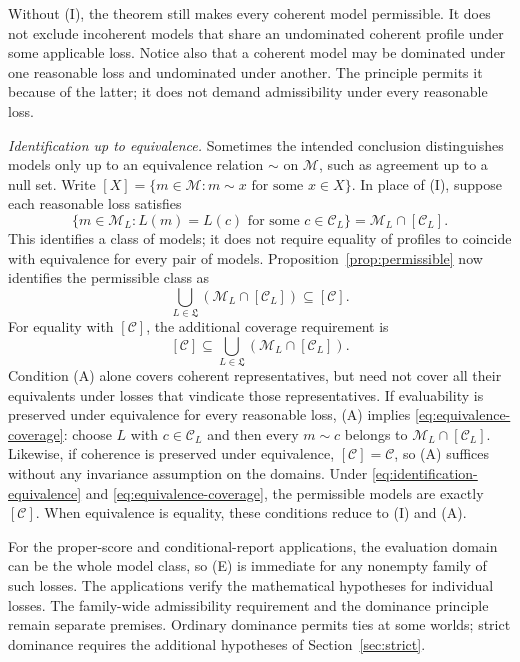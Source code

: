 \documentclass[11pt]{article}
\theoremstyle{definition}
\theoremstyle{remark}
\newcommand{\M}{\mathcal M}
\newcommand{\C}{\mathcal C}
\begin{document}
Without (I), the theorem still makes every coherent model permissible. It does not exclude incoherent models that share an undominated coherent profile under some applicable loss. Notice also that a coherent model may be dominated under one reasonable loss and undominated under another. The principle permits it because of the latter; it does not demand admissibility under every reasonable loss.

\emph{Identification up to equivalence.} Sometimes the intended conclusion distinguishes models only up to an equivalence relation $\sim$ on $\M$, such as agreement up to a null set. Write $[X]=\{m\in\M:m\sim x\text{ for some }x\in X\}$. In place of (I), suppose each reasonable loss satisfies
\begin{equation}\tag{I$_\sim$}\label{eq:identification-equivalence}
 \{m\in\M_L:L(m)=L(c)\text{ for some }c\in\C_L\}
 =\M_L\cap[\C_L].
\end{equation}
This identifies a class of models; it does not require equality of profiles to coincide with equivalence for every pair of models. Proposition~\ref{prop:permissible} now identifies the permissible class as
\[
 \bigcup_{L\in\mathfrak L}(\M_L\cap[\C_L])\subseteq[\C].
\]
For equality with $[\C]$, the additional coverage requirement is
\begin{equation}\tag{A$_\sim$}\label{eq:equivalence-coverage}
 [\C]\subseteq\bigcup_{L\in\mathfrak L}(\M_L\cap[\C_L]).
\end{equation}
Condition (A) alone covers coherent representatives, but need not cover all their equivalents under losses that vindicate those representatives. If evaluability is preserved under equivalence for every reasonable loss, (A) implies \eqref{eq:equivalence-coverage}: choose $L$ with $c\in\C_L$ and then every $m\sim c$ belongs to $\M_L\cap[\C_L]$. Likewise, if coherence is preserved under equivalence, $[\C]=\C$, so (A) suffices without any invariance assumption on the domains. Under \eqref{eq:identification-equivalence} and \eqref{eq:equivalence-coverage}, the permissible models are exactly $[\C]$. When equivalence is equality, these conditions reduce to (I) and (A).

For the proper-score and conditional-report applications, the evaluation domain can be the whole model class, so (E) is immediate for any nonempty family of such losses. The applications verify the mathematical hypotheses for individual losses. The family-wide admissibility requirement and the dominance principle remain separate premises. Ordinary dominance permits ties at some worlds; strict dominance requires the additional hypotheses of Section~\ref{sec:strict}.
\end{document}
